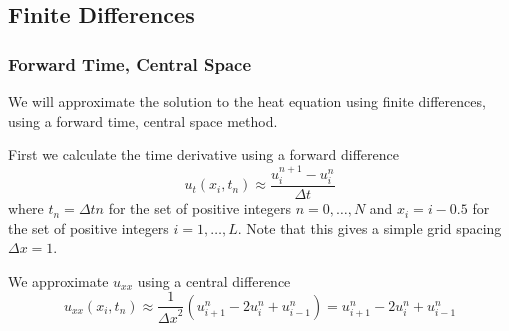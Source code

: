 \documentclass[11pt,a4paper,noindent]{article}
\begin{document}
%
%
%
%
%
%
%
%

\subsection{Finite Differences}
\subsubsection{Forward Time, Central Space}
We will approximate the solution to the heat equation using finite differences, using a forward time, central space method.

First we calculate the time derivative using a forward difference
\begin{equation}
u_t(x_{i},t_n) \approx \frac{u^{n+1}_i-u^{n}_i}{\Delta t}
\end{equation}
where $t_n = \Delta t n$ for the set of positive integers $n = 0,\ldots, N$ and $x_i = i-0.5$ for the set of positive integers $i = 1, \ldots, L$. Note that this gives a simple grid spacing $\Delta x = 1$.

We approximate $u_{xx}$ using a central difference
\begin{equation}
u_{xx}(x_i,t_n) \approx \frac{1}{{\Delta x}^2} (u^n_{i+1} - 2u^n_{i} + u^n_{i-1}) = u^n_{i+1} - 2u^n_{i} + u^n_{i-1}
\end{equation}
\end{document}
